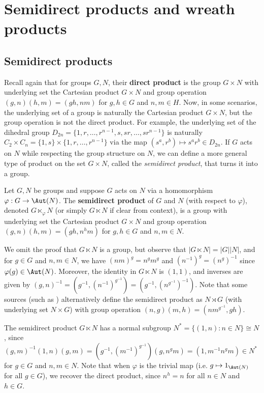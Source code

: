 \section{Semidirect products and wreath products}

\subsection{Semidirect products}

Recall again that for groups $G,N$, their \textbf{direct product} is the group $G \times N$ with underlying set the Cartesian product $G \times N$ and group operation $(g,n)(h,m) = (gh,nm)$ for $g,h \in G$ and $n,m \in H$. Now, in some scenarios, the underlying set of a group is naturally the Cartesian product $G \times N$, but the group operation is not the direct product. For example, the underlying set of the dihedral group $D_{2n} = \{1,r,\dotsc,r^{n-1},s,sr,\dotsc,sr^{n-1}\}$ is naturally $C_2 \times C_n = \{1,s\} \times \{1,r,\dotsc,r^{n-1}\}$ via the map $(s^a,r^b) \mapsto s^ar^b \in D_{2n}$. If $G$ acts on $N$ while respecting the group structure on $N$, we can define a more general type of product on the set $G \times N$, called the \textit{semidirect product}, that turns it into a group.

\begin{definition}\label{def:semidirect_product}
    Let $G,N$ be groups and suppose $G$ acts on $N$ via a homomorphism $\varphi : G \to \Aut(N)$. The \textbf{semidirect product} of $G$ and $N$ (with respect to $\varphi$), denoted $G \ltimes_\varphi N$ (or simply $G \ltimes N$ if clear from context), is a group with underlying set the Cartesian product $G \times N$ and group operation $(g,n)(h,m) = (gh,n^hm)$ for $g,h \in G$ and $n,m \in N$.
\end{definition}

We omit the proof that $G \ltimes N$ is a group, but observe that $|G \ltimes N| = |G||N|$, and for $g \in G$ and $n,m \in N$, we have $(nm)^g = n^g m^g$ and $(n^{-1})^g = (n^g)^{-1}$ since $\varphi(g) \in \Aut(N)$. Moreover, the identity in $G \ltimes N$ is $(1,1)$, and inverses are given by $(g,n)^{-1} = (g^{-1},(n^{-1})^{g^{-1}}) = (g^{-1},(n^{g^{-1}})^{-1})$. Note that some sources (such as \cite{dixon_mortimer_perm_groups1996}) alternatively define the semidirect product as $N \rtimes G$ (with underlying set $N \times G$) with group operation $(n,g)(m,h) = (nm^{g^{-1}},gh)$.

The semidirect product $G \ltimes N$ has  a normal subgroup $N^* = \{(1,n) : n \in N\} \cong N$, since $(g,m)^{-1}(1,n)(g,m) = (g^{-1},(m^{-1})^{g^{-1}})(g,n^gm) = (1,m^{-1}n^gm) \in N^*$ for $g \in G$ and $n,m \in N$. Note that when $\varphi$ is the trivial map (i.e. $g \mapsto 1_{\Aut(N)}$ for all $g \in G$), we recover the direct product, since $n^h = n$ for all $n \in N$ and $h \in G$.

